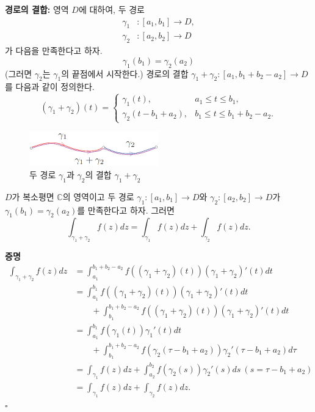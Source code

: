 {\bf  경로의 결합:} 
영역 $D$에 대하여, 두 경로
\begin{align*}
\gamma_1 &: [a_1, b_1] \to D, \\
\gamma_2 &: [a_2, b_2] \to D
\end{align*}
가 다음을 만족한다고 하자.
\[
\gamma_1(b_1) = \gamma_2(a_2)
\]
(그러면 $\gamma_2$는 $\gamma_1$의 끝점에서 시작한다.)
경로의 결합 $\gamma_1+\gamma_2: [a_1, b_1+b_2-a_2] \to D$를
다음과 같이 정의한다.
\[
(\gamma_1+\gamma_2)(t) = \begin{cases}
\gamma_1(t), & a_1\le t\le b_1, \\
\gamma_2(t-b_1+a_2), & b_1 \le t \le b_1+b_2-a_2.
\end{cases}
\]

\begin{figure}[!h]
\begin{center}
\includegraphics[width=0.5\textwidth]{./SaltChapter/figs/fig-3-10}
\end{center}
\caption{두 경로 $\gamma_1$과  $\gamma_2$의 결합 $\gamma_1 + \gamma_2$}
\label{fig-3-10}
\end{figure}

\begin{saltprop}{}{} \label{prop-3-3}
$D$가 복소평면 $\mathbb C$의 영역이고
두 경로 $\gamma_1: [a_1,b_1] \to D$와 $\gamma_2: [a_2,b_2] \to D$가 
$\gamma_1(b_1) = \gamma_2(a_2)$를 만족한다고 하자.
그러면
\[
\int_{\gamma_1+\gamma_2} f(z)dz 
=\int_{\gamma_1} f(z)dz + \int_{\gamma_2} f(z)dz.
\]
\end{saltprop}

{\bf 증명}
\begin{align*}
\int_{\gamma_1+\gamma_2} f(z)dz 
&= \int_{a_1}^{b_1+b_2-a_2} f((\gamma_1+\gamma_2)(t)) (\gamma_1+\gamma_2)'(t)dt\\
&= \int_{a_1}^{b_1} f((\gamma_1+\gamma_2)(t)) (\gamma_1+\gamma_2)'(t)dt\\
& \quad\quad 
+\int_{b_1}^{b_1+b_2-a_2} f((\gamma_1+\gamma_2)(t)) (\gamma_1+\gamma_2)'(t)dt\\
&= \int_{a_1}^{b_1} f(\gamma_1(t))\gamma_1'(t)dt \\
&\quad\quad 
+ \int_{b_1}^{b_1+b_2-a_2} f(\gamma_2(\tau-b_1+a_2))\gamma_2'(\tau-b_1+a_2)d\tau\\
&= \int_{\gamma_1} f(z)dz + \int_{a_2}^{b_2} f(\gamma_2(s)) \gamma_2'(s)ds 
\ (s=\tau-b_1+a_2) \\
&= \int_{\gamma_1} f(z)dz + \int_{\gamma_2} f(z)dz.
\end{align*}
\hfill $\square$

